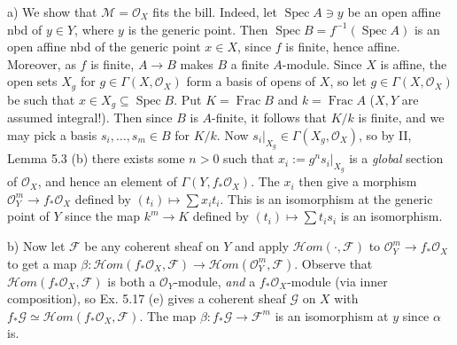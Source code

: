 \documentclass{report}
\newcommand{\F}{\mathcal{F}}
\renewcommand{\O}{\mathcal{O}}
\newcommand{\G}{\mathcal{G}}
\newcommand{\HOM}{\mathscr{H}\mathit{om}}
\DeclareMathOperator{\Spec}{Spec}
\DeclareMathOperator{\Frac}{Frac}
\begin{document}
\bigskip{}	a) We show that $\mathscr{M}=\O_X$ fits the bill.	Indeed, let $\Spec A\ni y$ be an open affine nbd of $y\in Y$,
where $y$ is the generic point.  Then $\Spec B= f^{-1}(\Spec A)$ is an open affine nbd of the generic point $x\in X$,
since $f$ is finite, hence affine.  Moreover, as $f$ is finite, $A\rightarrow B$ makes $B$ a finite $A$-module.
Since $X$ is affine, the open sets $X_g$ for $g\in \Gamma(X,\O_X)$ form a basis of opens of $X$,
so let $g\in \Gamma(X,\O_X)$ be such that $x\in X_g\subseteq \Spec B$.	Put $K=\Frac B$ and $k=\Frac A$
($X,Y$ are assumed integral!).  Then since $B$ is $A$-finite, it follows that $K/k$ is finite, and we may pick 
a basis $s_i,\ldots, s_m\in B$ for $K/k$.  Now $s_i\big|_{X_g}\in \Gamma(X_g,\O_X)$, so by II, Lemma 5.3 (b)
there exists some $n>0$ such that $x_i:=g^n s_i\big|_{X_g}$  is a {\em global} section of $\O_X$, and hence
an element of $\Gamma(Y,f_*\O_X)$.  The $x_i$ then give a morphism $\O_Y^m\rightarrow f_*\O_X$
defined by $(t_i)\mapsto \sum x_i t_i$.  This is an isomorphism at the generic point of $Y$ since
the map $k^m\rightarrow K$ defined by $(t_i)\mapsto \sum t_i s_i$ is an isomorphism.

\noindent
b)	Now let $\F$ be any coherent sheaf on $Y$ and apply $\HOM(\cdot,\F)$ to $\O_Y^m\rightarrow f_*\O_X$
to get a map $\beta: \HOM(f_*\O_X,\F)\rightarrow \HOM(\O_Y^m,\F)$.  Observe that $\HOM(f_*\O_X,\F)$
is both a $\O_Y$-module, {\em and} a $f_*\O_X$-module (via inner composition), so Ex. 5.17 (e) gives
a coherent sheaf $\G$ on $X$ with $f_*\G\simeq \HOM(f_*\O_X,\F)$.  The map 
$\beta:f_*\G\rightarrow \F^m$ is an isomorphism at $y$ since $\alpha$ is.
\end{document}
